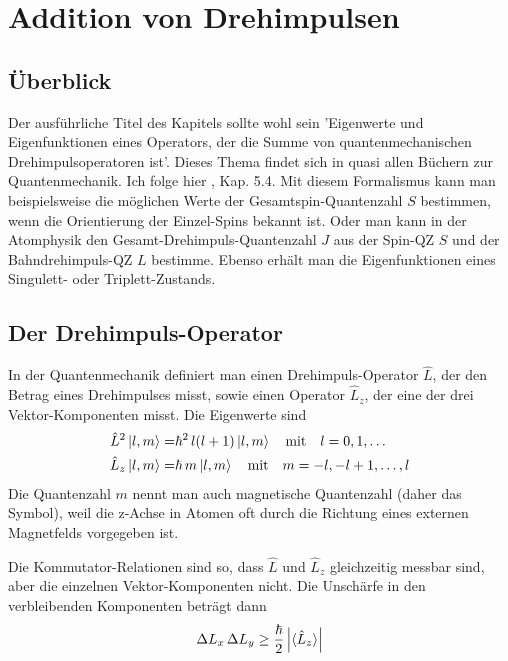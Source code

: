 
\chapter{Addition von Drehimpulsen}



\section{Überblick}

Der ausführliche Titel des Kapitels sollte wohl sein 'Eigenwerte und Eigenfunktionen eines Operators, der die Summe von quantenmechanischen Drehimpulsoperatoren ist'. Dieses Thema findet sich in quasi allen Büchern zur Quantenmechanik. Ich folge hier \cite{Nolting-QM}, Kap. 5.4. Mit diesem Formalismus kann man beispielsweise die möglichen Werte der Gesamtspin-Quantenzahl $S$ bestimmen, wenn die Orientierung der Einzel-Spins bekannt ist. Oder man kann in der Atomphysik den Gesamt-Drehimpuls-Quantenzahl $J$ aus der Spin-QZ $S$ und der Bahndrehimpuls-QZ $L$ bestimme. Ebenso erhält man die Eigenfunktionen eines Singulett- oder Triplett-Zustands.

\section{Der Drehimpuls-Operator}

In der Quantenmechanik definiert man einen Drehimpuls-Operator $\hat{L}$, der den Betrag eines Drehimpulses misst, sowie einen Operator $\hat{L}_z$, der eine der drei Vektor-Komponenten misst. Die Eigenwerte sind 
\begin{align}
	\hat{L}^2 \ket{l, m}  = & \hbar^2 \, l (l +1 ) \ket{l, m} \quad 
	\text{mit} \quad l = 0, 1, \dots \\
	\hat{L}_z \ket{l, m} = & \hbar \, m \ket{l, m} \quad 
	\text{mit} \quad m = -l, -l +1, \dots , l
\end{align}
Die Quantenzahl $m$ nennt man auch magnetische Quantenzahl (daher das Symbol), weil die z-Achse in Atomen oft durch die Richtung eines externen Magnetfelds vorgegeben ist.

Die Kommutator-Relationen sind so, dass $\hat{L}$ und $\hat{L}_z$ gleichzeitig messbar sind, aber die  einzelnen Vektor-Komponenten nicht. Die Unschärfe in den verbleibenden Komponenten beträgt dann
\begin{equation}
\Delta L_x \, \Delta L_y \ge \frac{\hbar}{2} \left| \braket{\hat{L}_z} \right|
\end{equation}


